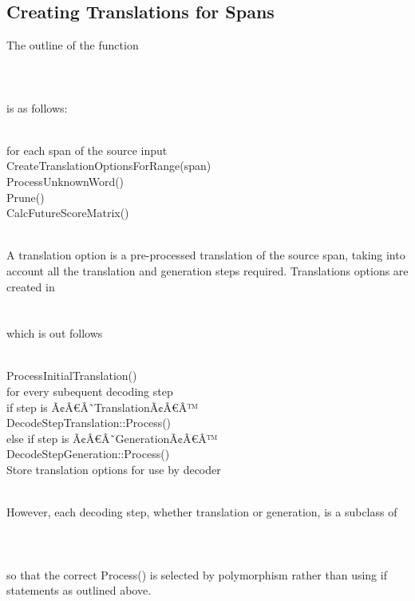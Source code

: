 \documentclass[11pt]{report}
\theoremstyle{plain}
\begin{document}
{\subsection{Creating Translations for Spans}
The outline of the function \\
\\
\\
\\
is as follows:\\
\\
\begin{tt}
\indent	for each span of the source input\\
\indent \indent	CreateTranslationOptionsForRange(span)\\
\indent	ProcessUnknownWord()\\
\indent	Prune()\\
\indent	CalcFutureScoreMatrix()\\
\end{tt}
\\
A translation option is a pre-processed translation of the source span, taking into account all the translation and generation steps required. Translations options are created in\\
\\
\\
which is out follows\\
\\
\begin{tt}
\indent	ProcessInitialTranslation()\\
\indent	for every subequent decoding step\\
\indent \indent	if step is Ã¢Â€Â˜TranslationÃ¢Â€Â™\\
\indent \indent \indent	DecodeStepTranslation::Process()\\
\indent \indent else if step is Ã¢Â€Â˜GenerationÃ¢Â€Â™\\
\indent \indent \indent DecodeStepGeneration::Process()\\
\indent Store translation options for use by decoder\\
\end{tt}
\\
However, each decoding step, whether translation or generation, is a subclass of\\
\\
\\
\\
so that the correct Process() is selected by polymorphism rather than using if statements as outlined above.
}
\end{document}
